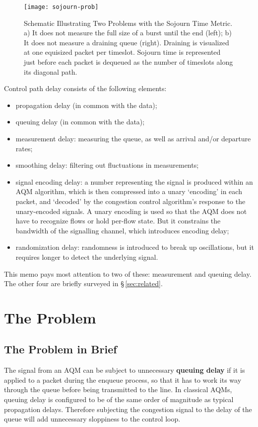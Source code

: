 \begin{figure*}
	\centering
	\texttt{[image: sojourn-prob]}
	\caption{Schematic Illustrating Two Problems with the Sojourn Time Metric. a) It does not measure the full size of a burst until the end (left); b) It does not measure a draining queue (right). Draining is visualized at one equisized packet per timeslot. Sojourn time is represented just before each packet is dequeued as the number of timeslots along its diagonal path.}\label{fig:sojourn-prob}
\end{figure*}

Control path delay consists of the following elements:
\begin{itemize}[nosep]
	\item propagation delay (in common with the data);
	\item queuing delay (in common with the data);
	\item measurement delay: measuring the queue, as well as arrival and/or departure rates;
	\item smoothing delay: filtering out fluctuations in measurements;
	\item signal encoding delay: a number representing the signal is produced within an AQM algorithm, which is then compressed into a unary `encoding' in each packet, and `decoded' by the congestion control algorithm's response to the unary-encoded signals. A unary encoding is used so that the AQM does not have to recognize flows or hold per-flow state. But it constrains the bandwidth of the signalling channel, which introduces encoding delay;
	\item randomization delay: randomness is introduced to break up oscillations, but it requires longer to detect the underlying signal.
\end{itemize}

This memo pays most attention to two of these: measurement and queuing delay. The other four are briefly surveyed in \S\,\ref{sec:related}.

\section{The Problem}\label{sigqdyntr_problem}
\subsection{The Problem in Brief}\label{sigqdyntr_problem_brief}
The signal from an AQM can be subject to unnecessary \textbf{queuing delay} if it is applied to a packet during the enqueue process, so that it has to work its way through the queue before being transmitted to the line. In classical AQMs, queuing delay is configured to be of the same order of magnitude as typical propagation delays. Therefore subjecting the congestion signal to the delay of the queue will add unnecessary sloppiness to the control loop.

